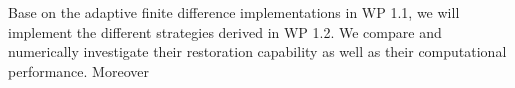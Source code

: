 \documentclass[enabledeprecatedfontcommands,cleardoublepage=empty,headsepline,twoside,11pt,DIV=15,BCOR=12mm,final]{scrartcl}
\begin{document}
 Base on the adaptive finite difference implementations in WP 1.1, we will implement the different strategies derived in WP 1.2. We compare and numerically investigate their restoration capability as well as their computational performance. Moreover
\end{document}
